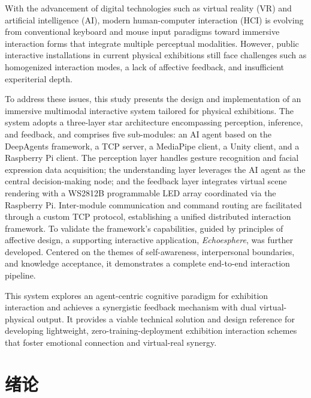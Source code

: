 \documentclass[bachelor]{njupthesis}
\begin{document}
\begin{englishabstract}
With the advancement of digital technologies such as virtual reality (VR) and artificial intelligence (AI), modern human-computer interaction (HCI) is evolving from conventional keyboard and mouse input paradigms toward immersive interaction forms that integrate multiple perceptual modalities. However, public interactive installations in current physical exhibitions still face challenges such as homogenized interaction modes, a lack of affective feedback, and insufficient experiterial depth.

To address these issues, this study presents the design and implementation of an immersive multimodal interactive system tailored for physical exhibitions. The system adopts a three-layer star architecture encompassing perception, inference, and feedback, and comprises five sub-modules: an AI agent based on the DeepAgents framework, a TCP server, a MediaPipe client, a Unity client, and a Raspberry Pi client. The perception layer handles gesture recognition and facial expression data acquisition; the understanding layer leverages the AI agent as the central decision-making node; and the feedback layer integrates virtual scene rendering with a WS2812B programmable LED array coordinated via the Raspberry Pi. Inter-module communication and command routing are facilitated through a custom TCP protocol, establishing a unified distributed interaction framework. To validate the framework’s capabilities, guided by principles of affective design, a supporting interactive application, \textit{Echoesphere}, was further developed. Centered on the themes of self-awareness, interpersonal boundaries, and knowledge acceptance, it demonstrates a complete end-to-end interaction pipeline.

This system explores an agent-centric cognitive paradigm for exhibition interaction and achieves a synergistic feedback mechanism with dual virtual-physical output. It provides a viable technical solution and design reference for developing lightweight, zero-training-deployment exhibition interaction schemes that foster emotional connection and virtual-real synergy.

\end{englishabstract}

\thesistableofcontents

\thesischapterexordium

\chapter{绪论}
\end{document}
